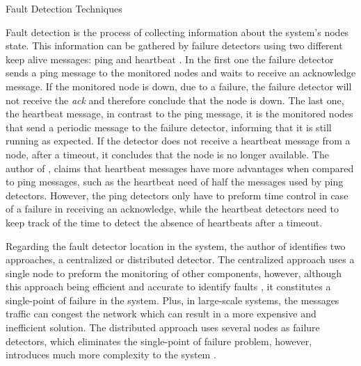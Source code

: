 \begin{Paragraph}{Fault Detection Techniques}
	
	Fault detection is the process of collecting information about the system's nodes state. This information can be gathered by failure detectors using two different keep alive messages: ping and heartbeat \cite{Zaiter2013}. In the first one the failure detector sends a ping message to the monitored nodes and waits to receive an acknowledge message. If the monitored node is down, due to a failure, the failure detector will not receive the \textit{ack} and therefore conclude that the node is down. The last one, the heartbeat message, in contrast to the ping message, it is the monitored nodes that send a periodic message to the failure detector, informing that it is still running as expected. If the detector does not receive a heartbeat message from a node, after a timeout, it concludes that the node is no longer available. The author of \cite{Zaiter2013}, claims that heartbeat messages have more advantages when compared to ping messages, such as the heartbeat need of half the messages used by ping detectors. However, the ping detectors only have to preform time control in case of a failure in receiving an acknowledge, while the heartbeat detectors need to keep track of the time to detect the absence of heartbeats after a timeout. 
	
	Regarding the fault detector location in the system, the author of \cite{kshir} identifies two approaches, a centralized or distributed detector. The centralized approach uses a single node to preform the monitoring of other components, however, although this approach being efficient and accurate to identify faults \cite{kshir}, it constitutes a single-point of failure in the system. Plus, in large-scale systems, the messages traffic can congest the network which can result in a more expensive and inefficient solution. The distributed approach uses several nodes as failure detectors, which eliminates the single-point of failure problem, however, introduces much more complexity to the system \cite{Zaiter2013}. 
	
	
\end{Paragraph}

